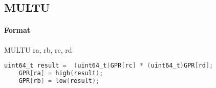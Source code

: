 \subsection{MULTU}


\paragraph{Format} MULTU ra, rb, rc, rd

\begin{lstlisting}[language=C]
    uint64_t result =  (uint64_t)GPR[rc] * (uint64_t)GPR[rd];
    GPR[ra] = high(result);
    GPR[rb] = low(result);
\end{lstlisting}